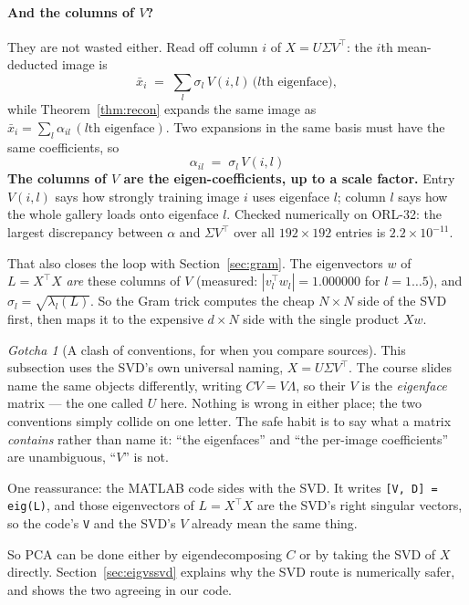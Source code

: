 \documentclass[11pt]{article}
\theoremstyle{definition}
\theoremstyle{remark}
\newtheorem*{gotcha}{Gotcha}
\begin{document}
\paragraph{And the columns of $V$?} They are not wasted either. Read off column
$i$ of $X=U\Sigma V^{\!\top}$: the $i$th mean-deducted image is
\[
  \bar{x}_i \;=\; \sum_{l} \sigma_l\, V(i,l)\,\bigl(\text{$l$th eigenface}\bigr),
\]
while Theorem~\ref{thm:recon} expands the same image as
$\bar{x}_i = \sum_l \alpha_{il}\,(\text{$l$th eigenface})$. Two expansions in the
same basis must have the same coefficients, so
\[
  \boxed{\;\alpha_{il} \;=\; \sigma_l\, V(i,l)\;}
\]
\textbf{The columns of $V$ are the eigen-coefficients, up to a scale factor.}
Entry $V(i,l)$ says how strongly training image $i$ uses eigenface $l$; column $l$
says how the whole gallery loads onto eigenface $l$. Checked numerically on
ORL-32: the largest discrepancy between $\alpha$ and $\Sigma V^{\!\top}$ over all
$192\times192$ entries is $2.2\times10^{-11}$.

That also closes the loop with Section~\ref{sec:gram}. The eigenvectors $w$ of
$L=X^{\!\top}\!X$ \emph{are} these columns of $V$ (measured:
$|v_l^{\!\top}w_l| = 1.000000$ for $l=1\ldots5$), and $\sigma_l=\sqrt{\lambda_l(L)}$.
So the Gram trick computes the cheap $N\times N$ side of the SVD first, then maps
it to the expensive $d\times N$ side with the single product $Xw$.

\begin{gotcha}[A clash of conventions, for when you compare sources]
This subsection uses the SVD's own universal naming, $X=U\Sigma V^{\!\top}$. The
course slides name the same objects differently, writing $CV=V\Lambda$, so their
$V$ is the \emph{eigenface} matrix --- the one called $U$ here. Nothing is wrong
in either place; the two conventions simply collide on one letter. The safe habit
is to say what a matrix \emph{contains} rather than name it: ``the eigenfaces''
and ``the per-image coefficients'' are unambiguous, ``$V$'' is not.

One reassurance: the MATLAB code sides with the SVD. It writes
\texttt{[V, D] = eig(L)}, and those eigenvectors of $L=X^{\!\top}\!X$ are the SVD's
right singular vectors, so the code's \texttt{V} and the SVD's $V$ already mean
the same thing.
\end{gotcha}

So PCA can be done either by eigendecomposing $C$ or by taking the SVD of $X$
directly. Section~\ref{sec:eigvssvd} explains why the SVD route is numerically
safer, and shows the two agreeing in our code.
\end{document}
